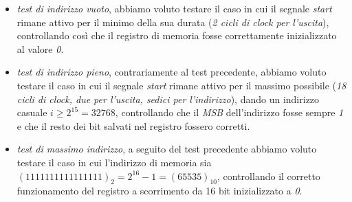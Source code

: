 \begin{itemize}
\tightlist
\item
  \emph{test di indirizzo vuoto}, abbiamo voluto testare il caso in cui
  il segnale \emph{start} rimane attivo per il minimo della sua durata
  (\emph{2 cicli di clock per l'uscita}), controllando così che il
  registro di memoria fosse correttamente inizializzato al valore
  \emph{0}.
\item
  \emph{test di indirizzo pieno}, contrariamente al test precedente,
  abbiamo voluto testare il caso in cui il segnale \emph{start} rimane
  attivo per il massimo possibile (\emph{18 cicli di clock, due per
  l'uscita, sedici per l'indirizzo}), dando un indirizzo casuale
  \(i\geq2^{15}=32768\), controllando che il \emph{MSB} dell'indirizzo
  fosse sempre \emph{1} e che il resto dei bit salvati nel registro
  fossero corretti.
\item
  \emph{test di massimo indirizzo}, a seguito del test precedente
  abbiamo voluto testare il caso in cui l'indirizzo di memoria sia
  \((1111111111111111)_2=2^{16}-1=(65535)_{10}\), controllando il
  corretto funzionamento del registro a scorrimento da 16 bit
  inizializzato a \emph{0}.
\end{itemize}

\pagebreak

